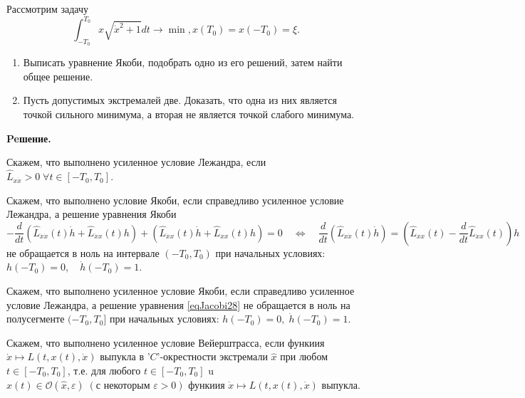 \begin{task}
    Рассмотрим задачу
    \begin{equation*}
        \int_{-T_0}^{T_0} x \sqrt{\dot{x}^2+1} d t \rightarrow \min , 
        x\left(T_0\right) = x \left( -T_0 \right) = \xi.
    \end{equation*}
    \begin{enumerate}
        \item Выписать уравнение Якоби, подобрать одно из его решений, 
        затем найти общее решение. 
        \item Пусть допустимых экстремалей две. Доказать, что одна из них 
        является точкой сильного минимума, а вторая не является точкой слабого минимума.
    \end{enumerate}


    \textbf{Peшение.} 
    \begin{definition}
        Скажем, что выполнено усиленное условие Лежандра, 
        если $\widehat L_{\dot{x}\dot{x}} > 0 \; \forall t \in [-T_0, T_0]$.
    \end{definition}

    \begin{definition} Скажем, что выполнено условие Якоби, 
        если справедливо усиленное условие Лежандра, а решение уравнения Якоби
        \begin{equation} \label{eqJacobi28} 
            -\frac{d}{d t}\left(\widehat{L}_{\dot{x} \dot{x}}(t) \dot{h}
                +\widehat{L}_{\dot{x} x}(t) h\right)
                +\left(\widehat{L}_{\dot{x} x}(t) \dot{h}
                +\widehat{L}_{x x}(t) h\right)=0 \quad 
                \Leftrightarrow \quad \frac{d}{d t}\left(\widehat{L}_{\dot{x} \dot{x}}(t) \dot{h}\right)
                =\left(\widehat{L}_{x x}(t)-\frac{d}{d t} \widehat{L}_{\dot{x} x}(t)\right) h
        \end{equation}
        не обращается в ноль на интервале $\left(-T_0, T_0\right)$ при начальных условиях: 
        $h\left(-T_0\right)=0, \quad \dot{h}\left(-T_0\right)=1$. 
    \end{definition}
    \begin{definition}
        Скажем, что выполнено усиленное условие Якоби, если справедливо усиленное условие 
        Лежандра, а решение уравнения \eqref{eqJacobi28} не обращается в ноль на полусегменте
        $(-T_0, T_0]$ при начальных условиях: ${h(-T_0)=0, \; \dot{h}(-T_0)=1}$.
    \end{definition}

    \begin{definition}
        Скажем, что выполнено усиленное условие Вейерштрасса, 
        если функиия $\dot{x} \mapsto L(t, x(t), \dot{x})$ 
        выпукла в '$C$'-окрестности экстремали $\widehat{x}$ 
        при любом $t \in\left[-T_0, T_0\right]$, т.е. для любого 
        $t \in\left[-T_0, T_0\right]$ u $x(t) \in 
        \mathcal{O}(\widehat{x}, \varepsilon) \;
        (\text {с некоторым } {\varepsilon>0})$ функиия
        $\dot{x} \mapsto L(t, x(t), \dot{x})$ выпукла.
    \end{definition}


\end{task}
